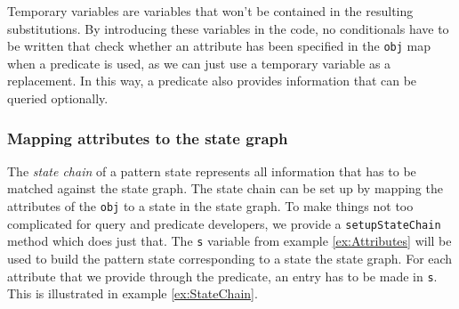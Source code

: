  Temporary variables are variables that won't be contained in the resulting substitutions. By introducing these variables in the code, no conditionals have to be written that check whether an attribute has been specified in the \texttt{obj} map when a predicate is used, as we can just use a temporary variable as a replacement. In this way, a predicate also provides information that can be queried optionally.

\subsubsection*{Mapping attributes to the state graph}

The \textit{state chain} of a pattern state represents all information that has to be matched against the state graph.
The state chain can be set up by mapping the attributes of the \texttt{obj} to a state in the state graph. To make things not too complicated for query and predicate developers, we provide a \texttt{setupStateChain} method which does just that. The \texttt{s} variable from example \ref{ex:Attributes} will be used to build the pattern state corresponding to a state the state graph. For each attribute that we provide through the predicate, an entry has to be made in \texttt{s}. This is illustrated in example \ref{ex:StateChain}.

